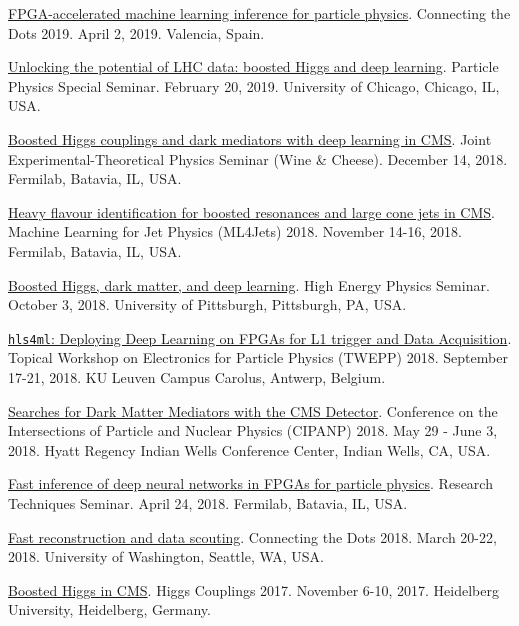 \documentclass{res}
\begin{document}
\begin{resume}
  \href{https://indico.cern.ch/event/742793/contributions/3274392/}{FPGA-accelerated machine learning inference for particle physics}. Connecting the Dots 2019. April 2, 2019. Valencia, Spain.

  \href{https://universityofchicago.hosted.panopto.com/Panopto/Pages/Viewer.aspx?id=66ca09d7-74c1-4b12-bb57-a9fa01046cdf}{Unlocking the potential of LHC data: boosted Higgs and deep learning}. Particle Physics Special Seminar. February 20, 2019. University of Chicago, Chicago, IL, USA.

  \href{http://theory.fnal.gov/events/event/results-from-cms-18/}{Boosted Higgs couplings and dark mediators with deep learning in CMS}. Joint Experimental-Theoretical Physics Seminar (Wine \& Cheese). December 14, 2018. Fermilab, Batavia, IL, USA.

  \href{https://indico.cern.ch/event/745718/contributions/3211982/}{Heavy flavour identification for boosted resonances and large cone jets in CMS}. Machine Learning for Jet Physics (ML4Jets) 2018. November 14-16, 2018. Fermilab, Batavia, IL, USA.

  \href{https://www.physicsandastronomy.pitt.edu/events/hep-seminar-javier-duarte-fermilab}{Boosted Higgs, dark matter, and deep learning}. High Energy Physics Seminar. October 3, 2018. University of Pittsburgh, Pittsburgh, PA, USA.

  \href{https://indico.cern.ch/event/697988/contributions/3055990/}{\texttt{hls4ml}: Deploying Deep Learning on FPGAs for L1 trigger and Data Acquisition}. Topical Workshop on Electronics for Particle Physics (TWEPP) 2018. September 17-21, 2018. KU Leuven Campus Carolus, Antwerp, Belgium.

  \href{https://conferences.lbl.gov/event/137/session/27/contribution/354}{Searches for Dark Matter Mediators with the CMS Detector}. Conference on the Intersections of Particle and Nuclear Physics (CIPANP) 2018. May 29 - June 3, 2018. Hyatt Regency Indian Wells Conference Center, Indian Wells, CA, USA.

  \href{https://indico.fnal.gov/event/16908/}{Fast inference of deep neural networks in FPGAs for particle physics}. Research Techniques Seminar. April 24, 2018. Fermilab, Batavia, IL, USA.

  \href{https://indico.cern.ch/event/658267/contributions/2881127/}{Fast reconstruction and data scouting}. Connecting the Dots 2018. March 20-22, 2018. University of Washington, Seattle, WA, USA.

  \href{http://www.thphys.uni-heidelberg.de/~higgs/talks/duarte.pdf}{Boosted Higgs in CMS}. Higgs Couplings 2017. November 6-10, 2017. Heidelberg University, Heidelberg, Germany.


\end{resume}
\end{document}
